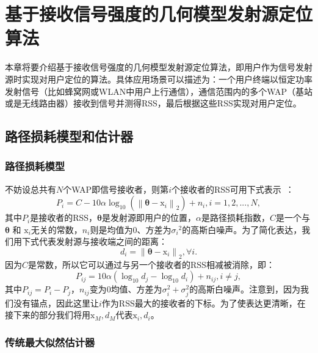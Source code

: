 \chapter{基于接收信号强度的几何模型发射源定位算法}
\label{cha:transmitter}

本章将要介绍基于接收信号强度的几何模型发射源定位算法，即用户作为信号发射源时实现对用户定位的算法。具体应用场景可以描述为：一个用户终端以恒定功率发射信号（比如蜂窝网或WLAN中用户上行通信），通信范围内的多个WAP（基站或是无线路由器）接收到信号并测得RSS，最后根据这些RSS实现对用户定位。

\section{路径损耗模型和估计器}

\subsection{路径损耗模型}

不妨设总共有$N$个WAP即信号接收者，则第$i$个接收者的RSS可用下式表示~\cite{erceg1999empirically}：
\begin{equation}
{P_i} = C - 10\alpha {\log _{10}}({\left\| {{\bm{\theta}} - {{\bm{\mathrm{x}}_i}}} \right\|_2}) + {n_i}, i = 1,2,...,N,\label{eq:rss}
\end{equation}
其中$P_i$是接收者的RSS，$\bm{\theta}$是发射源即用户的位置，$\alpha$是路径损耗指数，$C$是一个与$\bm{\theta}$ 和 $\bm{\mathrm{x}}_i$无关的常数，$n_i$则是均值为$0$、方差为${\sigma_i}^2$的高斯白噪声。为了简化表达，我们用下式代表发射源与接收端之间的距离：
\begin{equation}
d_i = {\left\| {{\bm{\theta}} - {{\bm{\mathrm{x}}_i}}} \right\|_2}, \forall i. \label{eq:d}
\end{equation}
因为$C$是常数，所以它可以通过与另一个接收者的RSS相减被消除，即：
\begin{equation}
{P_{ij}} = 10\alpha ({\log _{10}}d_j - {\log _{10}}d_i) + {n_{ij}}, i \neq j, \label{eq:diff_rss}
\end{equation}
其中$P_{ij} = P_i - P_j$，$n_{ij}$变为$0$均值、方差为$\sigma_i^2 + \sigma_j^2$的高斯白噪声。注意到，因为我们没有锚点，因此这里让$i$作为RSS最大的接收者的下标。为了使表达更清晰，在接下来的部分我们将用$\bm{\mathrm{x}}_M, d_M$代表$\bm{\mathrm{x}}_i, d_i$。

\subsection{传统最大似然估计器}

